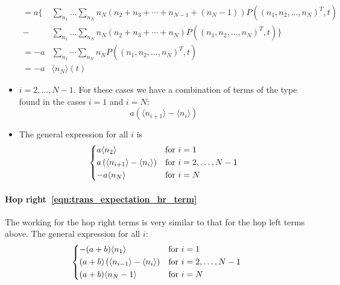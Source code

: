 \documentclass[a4paper,11pt]{report}
\numberwithin{equation}{section}
\newcommand{\E}[1]{\langle #1 \rangle}
\begin{document}
\begin{itemize}
\begin{align*}
            = a\biggl\{
                & \sum_{n_1} \dotso \sum_{n_N} n_N \left(n_2 + n_3 +
                \dotsb + n_{N-1} + (n_N - 1)\right)
                P\left(\left(n_1,n_2,\dotsc,n_N\right)^T,t\right) \\
                - & \sum_{n_1} \dotso \sum_{n_N} n_N\left(n_2 + n_3 + \dotsb +
                n_N\right) P\left(\left(n_1,n_2,\dotsc,n_N\right)^T,t\right)
            \biggr\} \\
            = - a & \sum_{n_1} \dotsb \sum_{n_N} n_N
                P\left(\left(n_1,n_2,\dotsc,n_N\right)^T,t\right) \\
            = - a & \E{n_N}(t)
        \end{align*}
    \item \(i=2,\dotsc,N-1\). For these cases we have a combination of terms of
        the type found in the cases \(i=1\) and \(i=N\):
        \begin{equation*}
            a\left(\E{n_{i+1}}-\E{n_i}\right)
        \end{equation*}
    \item The general expression for all \(i\) is
        \begin{equation*}
            \begin{dcases*}
                a\E{n_2} & for \(i=1\)\\
                a\left(\E{n_{i+1}} - \E{n_i}\right) & for \(i=2,\dotsc,N-1\)\\
                -a\E{n_N} & for \(i=N\)
            \end{dcases*}
        \end{equation*}
\end{itemize}

\paragraph{Hop right~\eqref{eqn:trans_expectation_hr_term}}
The working for the hop right terms is very similar to that for the hop left
terms above. The general expression for all \(i\):
\begin{equation*}
    \begin{dcases*}
        -(a+b)\E{n_1} & for \(i=1\)\\
        (a+b)\left(\E{n_{i-1}} - \E{n_i}\right) & for \(i=2,\dotsc,N-1\)\\
        (a+b)\E{n_N-1} & for \(i=N\)
    \end{dcases*}
\end{equation*}
\end{document}
